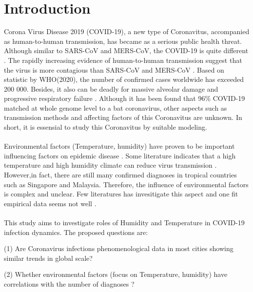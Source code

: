 \documentclass[11pt]{article}
\begin{document}
\clearpage
\tableofcontents


\linenumbers %

\newpage


\section{Introduction}  
Corona Virus Disease 2019 (COVID-19), a new type of Coronavitus, accompanied as human-to-human transmission,  has became as a serious public health threat. Although similar to SARS-CoV and MERS-CoV, the COVID-19 is quite different \citep{R6, R7, R8}. The rapidly increasing evidence of human-to-human transmission suggest that the virus is more contagious than SARS-CoV and MERS-CoV \citep{R11}. Based on statistic by WHO(2020), the number of confirmed cases worldwide has exceeded 200 000. Besides, it also can be deadly for massive alveolar damage and progressive respiratory failure \citep{R11}. Although it has been found that 96\%  COVID-19 matched at whole genome level to a bat coronavirus\citep{R14}, other aspects such as transmission methods and affecting factors of this Coronavitus are unknown. In short, it is essensial to study this Coronavitus by suitable modeling.

\paragraph{} Environmental factors  (Temperature, humidity) have proven to be important influencing factors on epidemic disease \citep{R1}.  Some literature indicates that a high temperature and high humidity climate can reduce virus transmission  \citep{R3} . However,in fact, there are still many confirmed diagnoses in tropical countries such as Singapore and Malaysia. Therefore, the influence of environmental factors is complex and unclear. Few literatures has invesitigate this aspect and one fit empirical data seems not well  \citep{R1}.

\paragraph{} This study aims to investigate roles of Humidity and Temperature in COVID-19 infection dynamics. The proposed questions are:

(1) Are Coronavirus infections phenomenological data in most cities showing similar trends in global scale? 

(2) Whether environmental factors (focus on Temperature, humidity) have correlations with the number of diagnoses ? 
\end{document}
